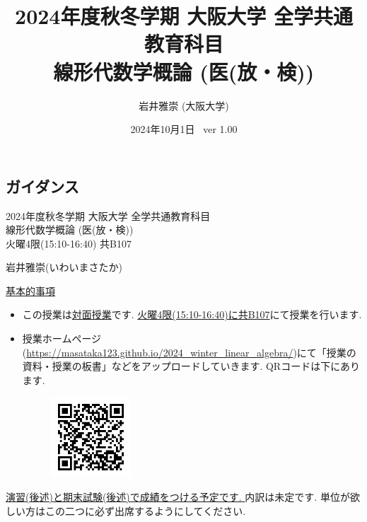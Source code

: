 \documentclass[dvipdfmx,a4paper,11pt]{article}
\title{2024年度秋冬学期 大阪大学 全学共通教育科目 \\ 線形代数学概論 (医(放・検))}
\author{岩井雅崇 (大阪大学)}
\date{2024年10月1日 \, ver 1.00}
\theoremstyle{definition}
\begin{document}
\maketitle
\tableofcontents
\newpage

\begin{center}
\setcounter{section}{-1}
\section{ガイダンス}
\label{sec-guide}
\end{center}

\begin{center}
{\Large 2024年度秋冬学期 大阪大学 全学共通教育科目 \\ 線形代数学概論 (医(放・検))} \\
火曜4限(15:10-16:40) 共B107
\end{center}
\begin{flushright}
 岩井雅崇(いわいまさたか) \\
\end{flushright}
{\Large \underline{基本的事項}}
\begin{itemize}
  \setlength{\parskip}{0cm} %
  \setlength{\itemsep}{0cm} %
\item この授業は\underline{対面授業}です. \underline{火曜4限(15:10-16:40)に共B107}にて授業を行います.
\item 授業ホームページ(\url{https://masataka123.github.io/2024_winter_linear_algebra/})にて「授業の資料・授業の板書」などをアップロードしていきます. 
QRコードは下にあります.
\begin{figure}[htbp]
\begin{center}
 \includegraphics[height=30mm, width=30mm]{linalg.png}
\end{center}
\end{figure}
\end{itemize}


\underline{演習(後述)と期末試験(後述)で成績をつける予定です. } 内訳は未定です. 単位が欲しい方はこの二つに必ず出席するようにしてください. 
\end{document}
